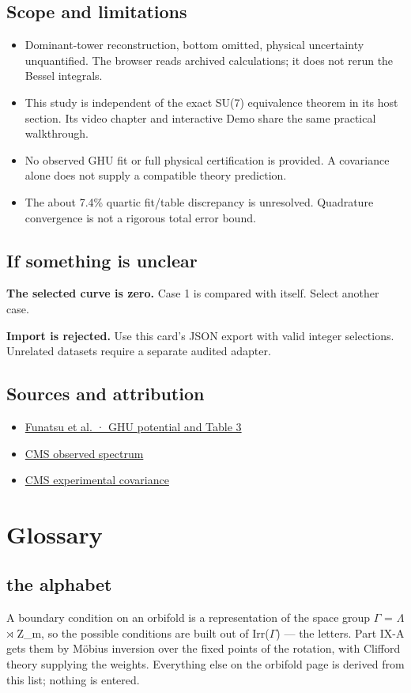 \documentclass[11pt,a4paper]{article}
\begin{document}
\subsection*{Scope and limitations}
\begin{itemize}
\item Dominant-tower reconstruction, bottom omitted, physical uncertainty unquantified. The browser reads archived calculations; it does not rerun the Bessel integrals.
\item This study is independent of the exact SU(7) equivalence theorem in its host section. Its video chapter and interactive Demo share the same practical walkthrough.
\item No observed GHU fit or full physical certification is provided. A covariance alone does not supply a compatible theory prediction.
\item The about 7.4\% quartic fit/table discrepancy is unresolved. Quadrature convergence is not a rigorous total error bound.
\end{itemize}
\subsection*{If something is unclear}
\textbf{The selected curve is zero.} Case 1 is compared with itself. Select another case.

\textbf{Import is rejected.} Use this card's JSON export with valid integer selections. Unrelated datasets require a separate audited adapter.

\subsection*{Sources and attribution}
\begin{itemize}
\item \href{https://arxiv.org/html/2002.09262v3}{Funatsu et al. · GHU potential and Table 3}
\item \href{https://doi.org/10.17182/hepdata.102956.v1/t37}{CMS observed spectrum}
\item \href{https://doi.org/10.17182/hepdata.102956.v1/t38}{CMS experimental covariance}
\end{itemize}
\section{Glossary}
\subsection*{the alphabet}
A boundary condition on an orbifold is a representation of the space group \ensuremath{\Gamma} = \ensuremath{\Lambda} \ensuremath{\rtimes} Z\_m, so the possible conditions are built out of Irr(\ensuremath{\Gamma}) --- the letters. Part IX-A gets them by Möbius inversion over the fixed points of the rotation, with Clifford theory supplying the weights. Everything else on the orbifold page is derived from this list; nothing is entered.
\end{document}
